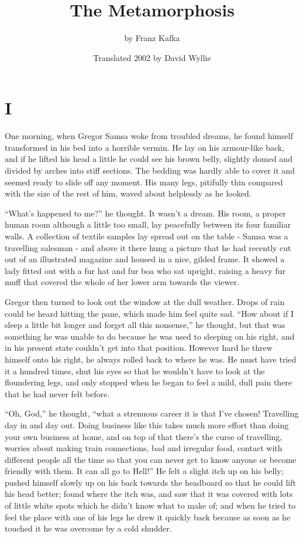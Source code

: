 \documentclass[12pt]{report}
\title{\HUGE\bfseries{The Metamorphosis}}
\author{\Large by Franz Kafka}
\date{\vspace{-4mm}Translated 2002 by David Wyllie}
\newcommand{\mychapter}[2]{
\setcounter{chapter}{#1}
    \setcounter{section}{0}
    \chapter*{#2}
    \addcontentsline{toc}{chapter}{#2}
}
\begin{document}
\begin{titlepage}
    \maketitle
\end{titlepage}


\mychapter{1}{I}\label{i}

One morning, when Gregor Samsa woke from troubled dreams, he found
himself transformed in his bed into a horrible vermin. He lay on his
armour-like back, and if he lifted his head a little he could see his
brown belly, slightly domed and divided by arches into stiff sections.
The bedding was hardly able to cover it and seemed ready to slide off
any moment. His many legs, pitifully thin compared with the size of the
rest of him, waved about helplessly as he looked.

``What's happened to me?'' he thought. It wasn't a dream. His room, a
proper human room although a little too small, lay peacefully between
its four familiar walls. A collection of textile samples lay spread out
on the table - Samsa was a travelling salesman - and above it there hung
a picture that he had recently cut out of an illustrated magazine and
housed in a nice, gilded frame. It showed a lady fitted out with a fur
hat and fur boa who sat upright, raising a heavy fur muff that covered
the whole of her lower arm towards the viewer.

Gregor then turned to look out the window at the dull weather. Drops of
rain could be heard hitting the pane, which made him feel quite sad.
``How about if I sleep a little bit longer and forget all this
nonsense,'' he thought, but that was something he was unable to do
because he was used to sleeping on his right, and in his present state
couldn't get into that position. However hard he threw himself onto his
right, he always rolled back to where he was. He must have tried it a
hundred times, shut his eyes so that he wouldn't have to look at the
floundering legs, and only stopped when he began to feel a mild, dull
pain there that he had never felt before.

``Oh, God,'' he thought, ``what a strenuous career it is that I've
chosen! Travelling day in and day out. Doing business like this takes
much more effort than doing your own business at home, and on top of
that there's the curse of travelling, worries about making train
connections, bad and irregular food, contact with different people all
the time so that you can never get to know anyone or become friendly
with them. It can all go to Hell!'' He felt a slight itch up on his
belly; pushed himself slowly up on his back towards the headboard so
that he could lift his head better; found where the itch was, and saw
that it was covered with lots of little white spots which he didn't know
what to make of; and when he tried to feel the place with one of his
legs he drew it quickly back because as soon as he touched it he was
overcome by a cold shudder.
\end{document}
